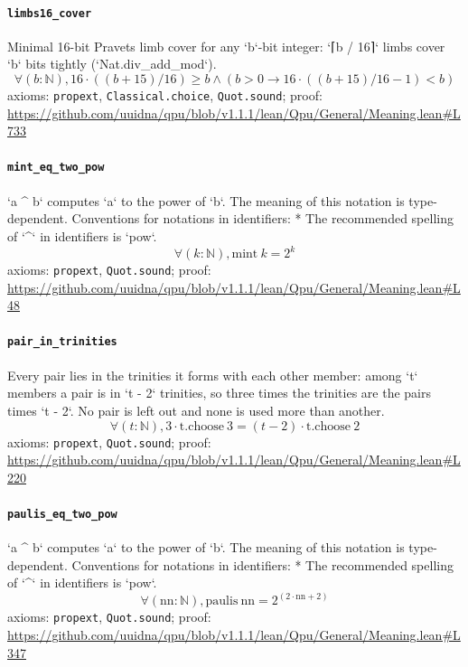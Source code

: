 \documentclass[11pt]{article}
\begin{document}
\paragraph{\texttt{limbs16\_cover}}
Minimal 16-bit Pravets limb cover for any `b`-bit integer: `⌈b / 16⌉` limbs cover `b` bits tightly (`Nat.div\_add\_mod`).
\[ \forall (b : \mathbb{N}), 16 \cdot ((b + 15) / 16) \ge b \land (b > 0 \to 16 \cdot ((b + 15) / 16 - 1) < b) \]
\noindent axioms: \texttt{propext}, \texttt{Classical.choice}, \texttt{Quot.sound}; proof: \url{https://github.com/uuidna/qpu/blob/v1.1.1/lean/Qpu/General/Meaning.lean\#L733}

\paragraph{\texttt{mint\_eq\_two\_pow}}
`a \^{} b` computes `a` to the power of `b`. The meaning of this notation is type-dependent.   Conventions for notations in identifiers:   * The recommended spelling of `\^{}` in identifiers is `pow`.
\[ \forall (k : \mathbb{N}), \mathrm{mint}\ k = 2 ^{k} \]
\noindent axioms: \texttt{propext}, \texttt{Quot.sound}; proof: \url{https://github.com/uuidna/qpu/blob/v1.1.1/lean/Qpu/General/Meaning.lean\#L48}

\paragraph{\texttt{pair\_in\_trinities}}
Every pair lies in the trinities it forms with each other member: among `t` members a pair is in `t - 2` trinities, so three times the trinities are the pairs times `t - 2`. No pair is left out and none is used more than another.
\[ \forall (t : \mathbb{N}), 3 \cdot \mathrm{t.choose}\ 3 = (t - 2) \cdot \mathrm{t.choose}\ 2 \]
\noindent axioms: \texttt{propext}, \texttt{Quot.sound}; proof: \url{https://github.com/uuidna/qpu/blob/v1.1.1/lean/Qpu/General/Meaning.lean\#L220}

\paragraph{\texttt{paulis\_eq\_two\_pow}}
`a \^{} b` computes `a` to the power of `b`. The meaning of this notation is type-dependent.   Conventions for notations in identifiers:   * The recommended spelling of `\^{}` in identifiers is `pow`.
\[ \forall (\mathrm{nn} : \mathbb{N}), \mathrm{paulis}\ \mathrm{nn} = 2 ^{(2 \cdot \mathrm{nn} + 2)} \]
\noindent axioms: \texttt{propext}, \texttt{Quot.sound}; proof: \url{https://github.com/uuidna/qpu/blob/v1.1.1/lean/Qpu/General/Meaning.lean\#L347}
\end{document}
